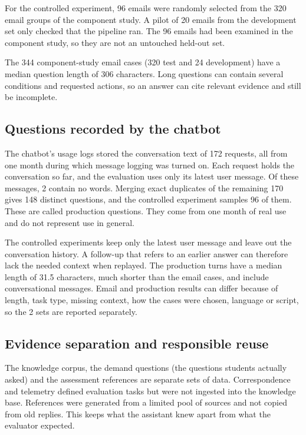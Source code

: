 For the controlled experiment, 96 emails were randomly selected from the 320 email groups of the component study. A pilot of 20 emails from the development set only checked that the pipeline ran. The 96 emails had been examined in the component study, so they are not an untouched held-out set.

The 344 component-study email cases (320 test and 24 development) have a median question length of 306 characters. Long questions can contain several conditions and requested actions, so an answer can cite relevant evidence and still be incomplete.

\subsection{Questions recorded by the chatbot}

The chatbot's usage logs stored the conversation text of 172 requests, all from one month during which message logging was turned on. Each request holds the conversation so far, and the evaluation uses only its latest user message. Of these messages, 2 contain no words. Merging exact duplicates of the remaining 170 gives 148 distinct questions, and the controlled experiment samples 96 of them. These are called production questions. They come from one month of real use and do not represent use in general.

The controlled experiments keep only the latest user message and leave out the conversation history. A follow-up that refers to an earlier answer can therefore lack the needed context when replayed. The production turns have a median length of 31.5 characters, much shorter than the email cases, and include conversational messages. Email and production results can differ because of length, task type, missing context, how the cases were chosen, language or script, so the 2 sets are reported separately.

\subsection{Evidence separation and responsible reuse}
\label{sec:evidence-separation}

The knowledge corpus, the demand questions (the questions students actually asked) and the assessment references are separate sets of data. Correspondence and telemetry defined evaluation tasks but were not ingested into the knowledge base. References were generated from a limited pool of sources and not copied from old replies. This keeps what the assistant knew apart from what the evaluator expected.

